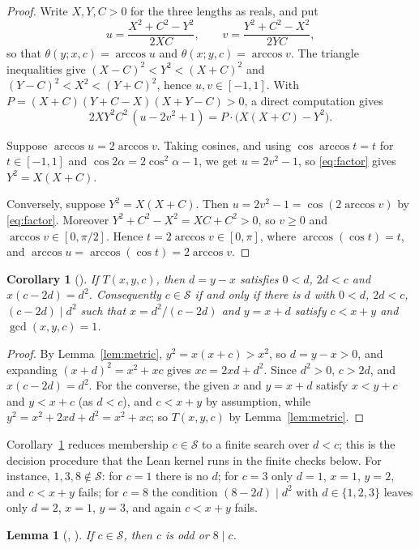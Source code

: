 \documentclass[11pt]{amsart}
\theoremstyle{plain}
\newtheorem{lemma}[theorem]{Lemma}
\newtheorem{corollary}[theorem]{Corollary}
\theoremstyle{definition}
\newcommand{\Side}{\mathcal{S}}
\newcommand{\ang}{\theta}
\begin{document}
\begin{proof}
Write $X,Y,C>0$ for the three lengths as reals, and put
\[
  u=\frac{X^2+C^2-Y^2}{2XC},\qquad v=\frac{Y^2+C^2-X^2}{2YC},
\]
so that $\ang(y;x,c)=\arccos u$ and $\ang(x;y,c)=\arccos v$. The triangle inequalities give $(X-C)^2<Y^2<(X+C)^2$ and $(Y-C)^2<X^2<(Y+C)^2$, hence $u,v\in[-1,1]$. With $P=(X+C)(Y+C-X)(X+Y-C)>0$, a direct computation gives
\begin{equation}\label{eq:factor}
  2XY^2C^2\,(u-2v^2+1)=P\cdot\bigl(X(X+C)-Y^2\bigr).
\end{equation}

Suppose $\arccos u=2\arccos v$. Taking cosines, and using $\cos\arccos t=t$ for $t\in[-1,1]$ and $\cos2\alpha=2\cos^2\alpha-1$, we get $u=2v^2-1$, so \eqref{eq:factor} gives $Y^2=X(X+C)$.

Conversely, suppose $Y^2=X(X+C)$. Then $u=2v^2-1=\cos(2\arccos v)$ by \eqref{eq:factor}. Moreover $Y^2+C^2-X^2=XC+C^2>0$, so $v\ge0$ and $\arccos v\in[0,\pi/2]$. Hence $t=2\arccos v\in[0,\pi]$, where $\arccos(\cos t)=t$, and $\arccos u=\arccos(\cos t)=2\arccos v$.
\end{proof}

\begin{corollary}[]\label{cor:search}
If $T(x,y,c)$, then $d=y-x$ satisfies $0<d$, $2d<c$ and $x(c-2d)=d^2$. Consequently $c\in\Side$ if and only if there is $d$ with $0<d$, $2d<c$, $(c-2d)\mid d^2$ such that $x=d^2/(c-2d)$ and $y=x+d$ satisfy $c<x+y$ and $\gcd(x,y,c)=1$.
\end{corollary}

\begin{proof}
By Lemma~\ref{lem:metric}, $y^2=x(x+c)>x^2$, so $d=y-x>0$, and expanding $(x+d)^2=x^2+xc$ gives $xc=2xd+d^2$. Since $d^2>0$, $c>2d$, and $x(c-2d)=d^2$. For the converse, the given $x$ and $y=x+d$ satisfy $x<y+c$ and $y<x+c$ (as $d<c$), and $c<x+y$ by assumption, while $y^2=x^2+2xd+d^2=x^2+xc$; so $T(x,y,c)$ by Lemma~\ref{lem:metric}.
\end{proof}

Corollary~\ref{cor:search} reduces membership $c\in\Side$ to a finite search over $d<c$; this is the decision procedure that the Lean kernel runs in the finite checks below. For instance, $1,3,8\notin\Side$: for $c=1$ there is no $d$; for $c=3$ only $d=1$, $x=1$, $y=2$, and $c<x+y$ fails; for $c=8$ the condition $(8-2d)\mid d^2$ with $d\in\{1,2,3\}$ leaves only $d=2$, $x=1$, $y=3$, and again $c<x+y$ fails.

\begin{lemma}[, ]\label{lem:mod}
If $c\in\Side$, then $c$ is odd or $8\mid c$.
\end{lemma}
\end{document}
